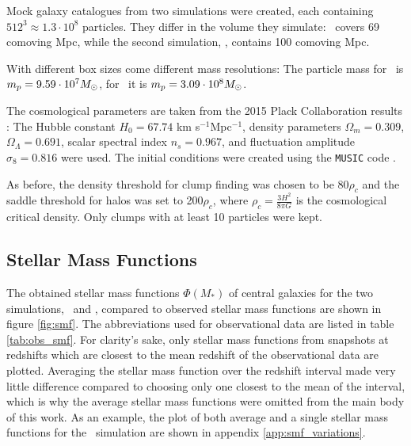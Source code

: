 Mock galaxy catalogues from two simulations were created, each containing $512^3 \approx 1.3\cdot 10^8$ particles.
They differ in the volume they simulate: \gsmall\ covers 69 comoving Mpc, while the second simulation, \glarge, contains 100 comoving Mpc.

With different box sizes come different mass resolutions: The particle mass for \gsmall\ is $m_p = 9.59\cdot 10^7M_\odot$, for \glarge\ it is $m_p = 3.09\cdot 10^8M_\odot$.

The cosmological parameters are taken from the 2015 Plack Collaboration results \parencite{Planck2015}: 
The Hubble constant $H_0 = 67.74$ km s$^{-1}$Mpc$^{-1}$, density parameters $\Omega_m = 0.309$, $\Omega_\Lambda = 0.691$, scalar spectral index $n_s = 0.967$, and fluctuation amplitude $\sigma_8 = 0.816$ were used.
The initial conditions were created using the \texttt{MUSIC} code \parencite{MUSIC}.


As before, the density threshold for clump finding was chosen to be 80$\rho_c$  and the saddle threshold for halos was set to 200$\rho_c$, where $\rho_c = \frac{3 H^2}{8 \pi G}$ is the cosmological critical density. 
Only clumps with at least 10 particles were kept.








\subsection{Stellar Mass Functions}\label{chap:smf}

The obtained stellar mass functions $\Phi(M_*)$ of central galaxies for the two simulations, \gsmall\ and \glarge, compared to observed stellar mass functions are shown in figure \ref{fig:smf}.
The abbreviations used for observational data are listed in table \ref{tab:obs_smf}.
For clarity's sake, only stellar mass functions from snapshots at redshifts which are closest to the mean redshift of the observational data are plotted.
Averaging the stellar mass function over the redshift interval made very little difference compared to choosing only one closest to the mean of the interval, which is why the average stellar mass functions were omitted from the main body of this work.
As an example, the plot of both average and a single stellar mass functions for the \gsmall\ simulation are shown in appendix \ref{app:smf_variations}.




